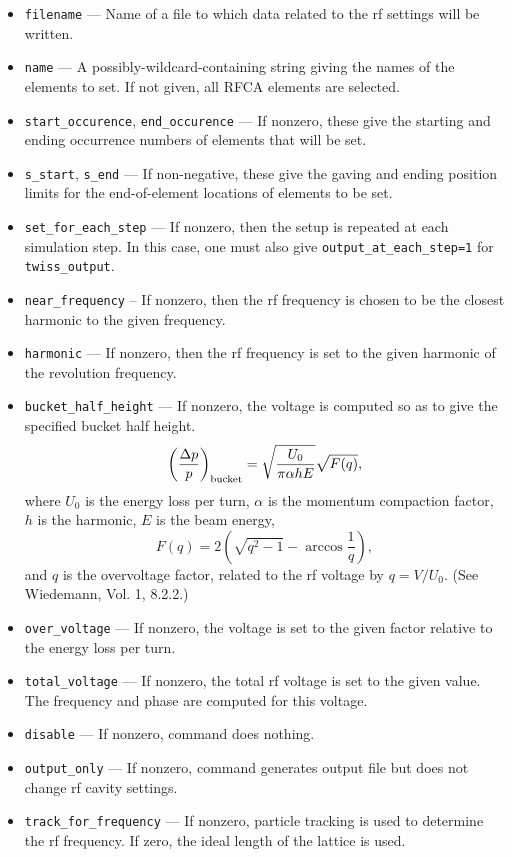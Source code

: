 \documentclass[11pt]{article}
\begin{document}
\begin{itemize}
\item \verb|filename| --- Name of a file to which data related to the rf settings will be written.
\item \verb|name| --- A possibly-wildcard-containing string giving the names of the
        elements to set.  If not given, all RFCA elements are selected.
\item \verb|start_occurence|, \verb|end_occurence| --- If nonzero, these give the starting and
 ending occurrence numbers of elements that will be set. 
\item \verb|s_start|, \verb|s_end| --- If non-negative, these give the gaving and ending position
 limits for the end-of-element locations of elements to be set.
\item \verb|set_for_each_step| --- If nonzero, then the setup is repeated at each simulation step.
  In this case, one must also give \verb|output_at_each_step=1| for \verb|twiss_output|.
\item \verb|near_frequency| -- If nonzero, then the rf frequency is chosen to be the closest harmonic
  to the given frequency.
\item \verb|harmonic| --- If nonzero, then the rf frequency is set to the given harmonic of the revolution
  frequency.
\item \verb|bucket_half_height| --- If nonzero, the voltage is computed so as to give the specified bucket
  half height. 
\begin{equation}
\left(\frac{\Delta p}{p}\right)_{\rm bucket} = \sqrt{\frac{U_0}{\pi \alpha h E}}\sqrt{F(q)},
\end{equation} 
where $U_0$ is the energy loss per turn, $\alpha$ is the momentum compaction factor, $h$ is the harmonic, 
$E$ is the beam energy, 
\begin{equation}
F(q) = 2 \left(\sqrt{q^2-1} - \arccos \frac{1}{q}\right),
\end{equation}
and $q$ is the overvoltage factor, related to the rf voltage by $q = V/U_0$. (See Wiedemann, Vol. 1, 8.2.2.)
\item \verb|over_voltage| --- If nonzero, the voltage is set to the given factor relative to the 
energy loss per turn.
\item \verb|total_voltage| --- If nonzero, the total rf voltage is set to the given value. The frequency and
  phase are computed for this voltage.
\item \verb|disable| --- If nonzero, command does nothing.
\item \verb|output_only| --- If nonzero, command generates output file but does not change rf cavity settings.
\item \verb|track_for_frequency| --- If nonzero, particle tracking is used to determine the rf frequency. If zero,
  the ideal length of the lattice is used.
\end{itemize}
\end{document}
